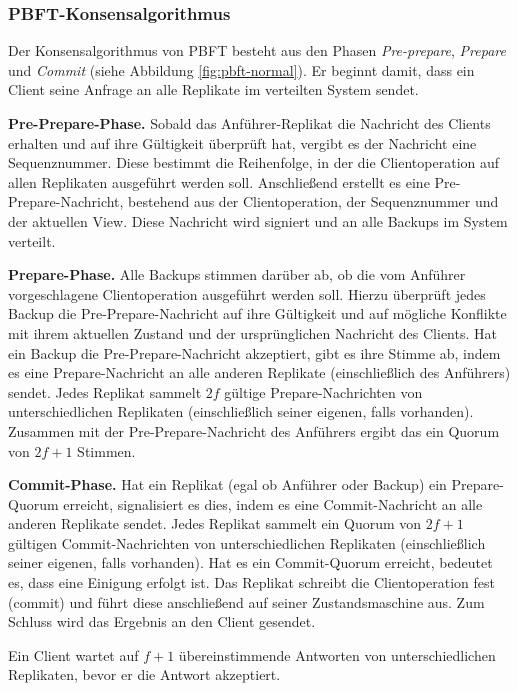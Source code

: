 \documentclass[nonacm,sigconf,natbib=false]{acmart}
\begin{document}
\subsubsection{PBFT-Konsensalgorithmus}

Der Konsensalgorithmus von PBFT besteht aus den Phasen \emph{Pre-prepare}, \emph{Prepare} und \emph{Commit} (siehe Abbildung \ref{fig:pbft-normal}). Er beginnt damit, dass ein Client seine Anfrage an alle Replikate im verteilten System sendet.

\textbf{Pre-Prepare-Phase.} Sobald das Anführer-Replikat die Nachricht des Clients erhalten und auf ihre Gültigkeit überprüft hat, vergibt es der Nachricht eine Sequenznummer. Diese bestimmt die Reihenfolge, in der die Clientoperation auf allen Replikaten ausgeführt werden soll. Anschließend erstellt es eine Pre-Prepare-Nachricht, bestehend aus der Clientoperation, der Sequenznummer und der aktuellen View. Diese Nachricht wird signiert und an alle Backups im System verteilt.

\textbf{Prepare-Phase.} Alle Backups stimmen darüber ab, ob die vom Anführer vorgeschlagene Clientoperation ausgeführt werden soll. Hierzu überprüft jedes Backup die Pre-Prepare-Nachricht auf ihre Gültigkeit und auf mögliche Konflikte mit ihrem aktuellen Zustand und der ursprünglichen Nachricht des Clients. Hat ein Backup die Pre-Prepare-Nachricht akzeptiert, gibt es ihre Stimme ab, indem es eine Prepare-Nachricht an alle anderen Replikate (einschließlich des Anführers) sendet. Jedes Replikat sammelt $2f$ gültige Prepare-Nachrichten von unterschiedlichen Replikaten (einschließlich seiner eigenen, falls vorhanden). Zusammen mit der Pre-Prepare-Nachricht des Anführers ergibt das ein Quorum von $2f+1$ Stimmen.

\textbf{Commit-Phase.} Hat ein Replikat (egal ob Anführer oder Backup) ein Prepare-Quorum erreicht, signalisiert es dies, indem es eine Commit-Nachricht an alle anderen Replikate sendet. Jedes Replikat sammelt ein Quorum von $2f+1$ gültigen Commit-Nachrichten von unterschiedlichen Replikaten (einschließlich seiner eigenen, falls vorhanden). Hat es ein Commit-Quorum erreicht, bedeutet es, dass eine Einigung erfolgt ist. Das Replikat schreibt die Clientoperation fest (commit) und führt diese anschließend auf seiner Zustandsmaschine aus. Zum Schluss wird das Ergebnis an den Client gesendet.

Ein Client wartet auf $f+1$ übereinstimmende Antworten von unterschiedlichen Replikaten, bevor er die Antwort akzeptiert.
\end{document}
